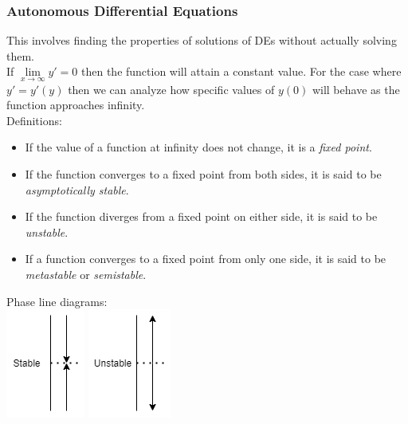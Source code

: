 \documentclass[11pt, fleqn]{article}
\begin{document}
\subsubsection{Autonomous Differential Equations}
This involves finding the properties of solutions of DEs without actually solving them.\\
If $\lim\limits_{x\to\infty}y'=0$ then the function will attain a constant value. For the case where $y'=y'(y)$ then we can analyze how specific values of $y(0)$ will behave as the function approaches infinity.\\
Definitions:
\begin{itemize}
    \item If the value of a function at infinity does not change, it is a \textit{fixed point}.
    \item If the function converges to a fixed point from both sides, it is said to be \textit{asymptotically stable}.
    \item If the function diverges from a fixed point on either side, it is said to be \textit{unstable}.
    \item If a function converges to a fixed point from only one side, it is said to be \textit{metastable} or \textit{semistable}.
\end{itemize}
Phase line diagrams:\\
\includegraphics[scale=1]{ODEPictures/PhaseLineStable.png} \includegraphics[scale=1]{ODEPictures/PhaseLineUnstable.png}
\end{document}
